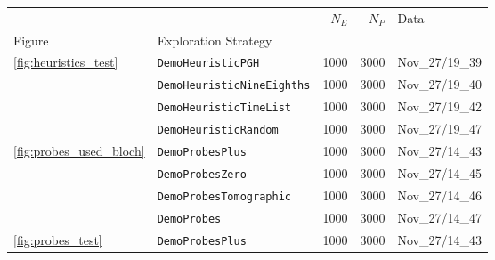 \begin{tabular}{llrrl}
\hline
                                 &                                 &                                    $N_E$ &                                    $N_P$ &                                     Data \\
Figure & Exploration Strategy &                                          &                                          &                                          \\
\midrule
\multirow{4}{*}{\cref{fig:heuristics_test}} & \texttt{DemoHeuristicPGH} &                                     1000 &                                     3000 &                           Nov\_27/19\_39 \\
                                 & \texttt{DemoHeuristicNineEighths} &                                     1000 &                                     3000 &                           Nov\_27/19\_40 \\
                                 & \texttt{DemoHeuristicTimeList} &                                     1000 &                                     3000 &                           Nov\_27/19\_42 \\
                                 & \texttt{DemoHeuristicRandom} &                                     1000 &                                     3000 &                           Nov\_27/19\_47 \\
\cline{1-5}
\multirow{4}{*}{\cref{fig:probes_used_bloch}} & \texttt{DemoProbesPlus} &                                     1000 &                                     3000 &                           Nov\_27/14\_43 \\
                                 & \texttt{DemoProbesZero} &                                     1000 &                                     3000 &                           Nov\_27/14\_45 \\
                                 & \texttt{DemoProbesTomographic} &                                     1000 &                                     3000 &                           Nov\_27/14\_46 \\
                                 & \texttt{DemoProbes} &                                     1000 &                                     3000 &                           Nov\_27/14\_47 \\
\cline{1-5}
\multirow{4}{*}{\cref{fig:probes_test}} & \texttt{DemoProbesPlus} &                                     1000 &                                     3000 &                           Nov\_27/14\_43 \\

\end{tabular}
